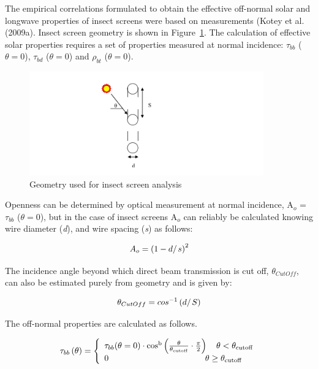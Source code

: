 {The empirical correlations formulated to obtain the effective off-normal solar and longwave properties of insect screens were based on measurements (Kotey et al. (2009a). Insect screen geometry is shown in Figure~\ref{fig:geometry-used-for-insect-screen-analysis}. The calculation of effective solar properties requires a set of properties measured at normal incidence: $\tau_{bb}$ ($\theta = 0$), $\tau_{bd}$ ($\theta = 0$) and $\rho_{bt}$ ($\theta = 0$).

\begin{figure}[hbtp] %
\centering
\includegraphics[width=0.9\textwidth, height=0.9\textheight, keepaspectratio=true]{media/image1857.svg.png}
\caption{Geometry used for insect screen analysis \protect \label{fig:geometry-used-for-insect-screen-analysis}}
\end{figure}

Openness can be determined by optical measurement at normal incidence, A\(_{o}\) = $\tau_{bb}$ ($\theta = 0$), but in the case of insect screens A\(_{o}\) can reliably be calculated knowing wire diameter (\emph{d}), and wire spacing (\emph{s}) as follows:

\begin{equation}
{A_o} = {\left( {1 - {d \mathord{\left/ {\vphantom {d s}} \right. } s}} \right)^2}
\end{equation}

The incidence angle beyond which direct beam transmission is cut off, {$\theta$}\(_{CutOff}\), can also be estimated purely from geometry and is given by:

\begin{equation}
{\theta_{CutOff}} = co{s^{ - 1}}\left( {{d \mathord{\left/ {\vphantom {d S}} \right. } S}} \right)
\end{equation}

The off-normal properties are calculated as follows.

\begin{equation}
{\tau_{bb}}\left( {\rm{\theta }} \right) = \left\{ \begin{array}{l}{\tau_{bb}}{\rm{(\theta }} = {\rm{0)}} \cdot {\rm{co}}{{\rm{s}}^{\rm{b}}}\left( {\frac{{\rm{\theta }}}{{{{\rm{\theta }}_{{\rm{cutoff}}}}}} \cdot \frac{\pi }{{\rm{2}}}} \right)\quad {\rm{\theta }} < {{\rm{\theta }}_{{\rm{cutoff}}}}\\0\quad \quad \quad \quad \quad \quad \quad \quad \quad \quad \quad \;\,{\rm{\theta }} \ge {{\rm{\theta }}_{{\rm{cutoff}}}}\end{array} \right.
\end{equation}

}
